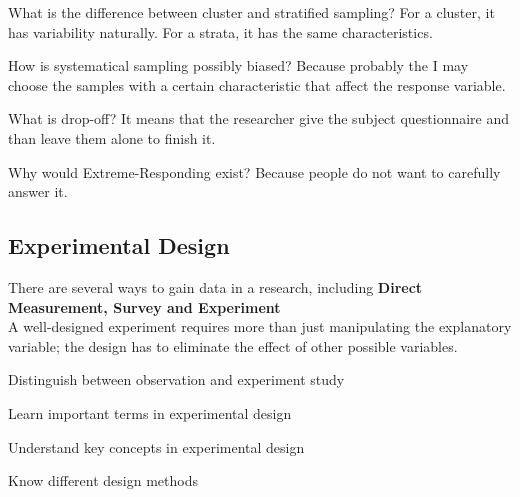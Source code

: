 \begin{Question}
What is the difference between cluster and stratified sampling?
\solution For a cluster, it has variability naturally. For a strata, it has the same characteristics.
\end{Question}
\begin{Question}
How is systematical sampling possibly biased?
\solution Because probably the I may choose the samples with a certain characteristic that affect the response variable.
\end{Question}
\begin{Question}
What is drop-off?
\solution It means that the researcher give the subject questionnaire and than leave them alone to finish it.
\end{Question}
\begin{Question}
Why would Extreme-Responding exist?
\solution Because people do not want to carefully answer it.
\end{Question}




    
\subsection{Experimental Design}
There are several ways to gain data in a research, including \textbf{Direct Measurement, Survey and Experiment}
\\ A well-designed experiment requires more than just manipulating the explanatory variable;  the design has to eliminate the effect of other possible variables.\\
\begin{objectives}
    \item Distinguish between observation and experiment study
    \item Learn important terms in experimental design
    \item Understand key concepts in experimental design
    \item Know different design methods
\end{objectives}
